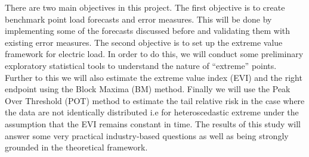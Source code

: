 There are two main objectives in this project. The first objective is to create benchmark point load forecasts and error measures. This will be done by implementing some of the forecasts discussed before and validating them with existing error measures. The second objective is to set up the extreme value framework for electric load. In order to do this, we will conduct some preliminary exploratory statistical tools to understand the nature of ``extreme'' points. Further to this we will also estimate the extreme value index (EVI) and the right endpoint using the Block Maxima (BM) method. Finally we will use the Peak Over Threshold (POT) method to estimate the tail relative risk in the case where the data are not identically distributed i.e for heteroscedastic extreme under the assumption that the EVI remains constant in time. The results of this study will answer some very practical industry-based questions as well as being strongly grounded in the theoretical framework.